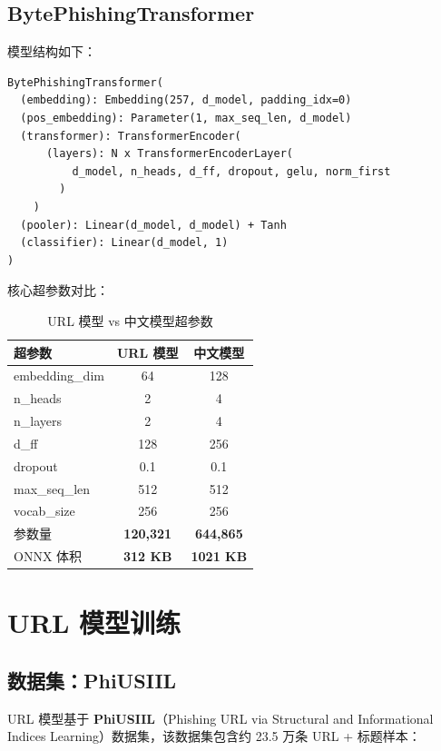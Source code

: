 \documentclass[11pt,a4paper]{article}
\begin{document}
\subsection{BytePhishingTransformer}

模型结构如下：

\begin{Verbatim}[frame=single,fontsize=\small]
BytePhishingTransformer(
  (embedding): Embedding(257, d_model, padding_idx=0)
  (pos_embedding): Parameter(1, max_seq_len, d_model)
  (transformer): TransformerEncoder(
      (layers): N x TransformerEncoderLayer(
          d_model, n_heads, d_ff, dropout, gelu, norm_first
        )
    )
  (pooler): Linear(d_model, d_model) + Tanh
  (classifier): Linear(d_model, 1)
)
\end{Verbatim}

核心超参数对比：

\begin{table}[h]
\centering
\caption{URL 模型 vs 中文模型超参数}
\begin{tabular}{lcc}
\toprule
超参数 & URL 模型 & 中文模型 \\
\midrule
embedding\_dim & 64 & 128 \\
n\_heads & 2 & 4 \\
n\_layers & 2 & 4 \\
d\_ff & 128 & 256 \\
dropout & 0.1 & 0.1 \\
max\_seq\_len & 512 & 512 \\
vocab\_size & 256 & 256 \\
参数量 & \textbf{120,321} & \textbf{644,865} \\
ONNX 体积 & \textbf{312 KB} & \textbf{1021 KB} \\
\bottomrule
\end{tabular}
\end{table}

\section{URL 模型训练}

\subsection{数据集：PhiUSIIL}

URL 模型基于 \textbf{PhiUSIIL}（Phishing URL via Structural and Informational Indices Learning）数据集，该数据集包含约 23.5 万条 URL + 标题样本：
\end{document}
